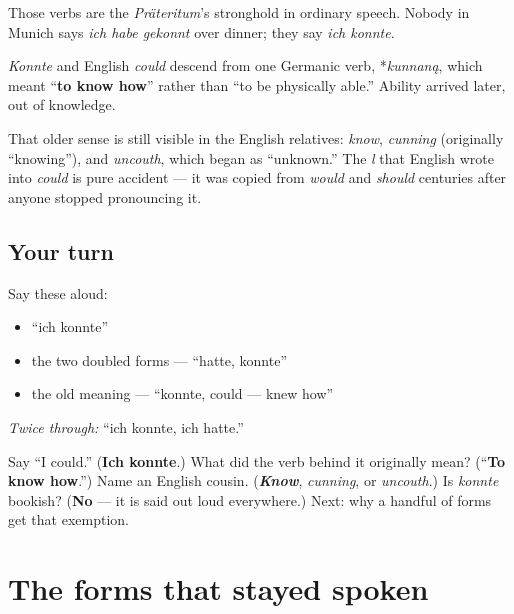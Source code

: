 Those verbs are the \emph{Präteritum}'s stronghold in ordinary speech. Nobody in Munich says \emph{ich habe gekonnt} over dinner; they say \emph{ich konnte}.

\begin{cousinweb}
\emph{Konnte} and English \emph{could} descend from one Germanic verb, *\emph{kunnaną}, which meant \textquotedblleft{}\textbf{to know how}\textquotedblright{} rather than \textquotedblleft{}to be physically able.\textquotedblright{} Ability arrived later, out of knowledge.

That older sense is still visible in the English relatives: \emph{know}, \emph{cunning} (originally \textquotedblleft{}knowing\textquotedblright{}), and \emph{uncouth}, which began as \textquotedblleft{}unknown.\textquotedblright{} The \emph{l} that English wrote into \emph{could} is pure accident — it was copied from \emph{would} and \emph{should} centuries after anyone stopped pronouncing it.
\end{cousinweb}

\subsection*{Your turn}
Say these aloud:

\begin{itemize}
\raggedright
  \item \textquotedblleft{}ich konnte\textquotedblright{}
  \item the two doubled forms — \textquotedblleft{}hatte, konnte\textquotedblright{}
  \item the old meaning — \textquotedblleft{}konnte, could — knew how\textquotedblright{}
\end{itemize}

\emph{Twice through:} \textquotedblleft{}ich konnte, ich hatte.\textquotedblright{}

\begin{tcolorbox}[breakable,colback=teal!4,colframe=teal!35!black,title={Before you move on}]
Say \textquotedblleft{}I could.\textquotedblright{} (\textbf{Ich konnte}.) What did the verb behind it originally mean? (\textquotedblleft{}\textbf{To know how}.\textquotedblright{}) Name an English cousin. (\emph{\textbf{Know}}, \emph{cunning}, or \emph{uncouth}.) Is \emph{konnte} bookish? (\textbf{No} — it is said out loud everywhere.) Next: why a handful of forms get that exemption.
\end{tcolorbox}
\section[hatte, konnte]{The forms that stayed spoken}

